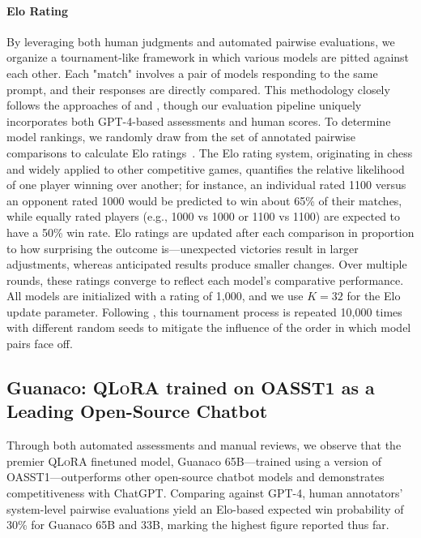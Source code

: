 \paragraph{Elo Rating} By leveraging both human judgments and automated pairwise evaluations, we organize a tournament-like framework in which various models are pitted against each other. Each "match" involves a pair of models responding to the same prompt, and their responses are directly compared. This methodology closely follows the approaches of \citet{bai2022training} and \citet{vicuna2023}, though our evaluation pipeline uniquely incorporates both GPT-4-based assessments and human scores. To determine model rankings, we randomly draw from the set of annotated pairwise comparisons to calculate Elo ratings~\citep{elo1967proposed,elo1978rating}. The Elo rating system, originating in chess and widely applied to other competitive games, quantifies the relative likelihood of one player winning over another; for instance, an individual rated 1100 versus an opponent rated 1000 would be predicted to win about 65\% of their matches, while equally rated players (e.g., 1000 vs 1000 or 1100 vs 1100) are expected to have a 50\% win rate. Elo ratings are updated after each comparison in proportion to how surprising the outcome is—unexpected victories result in larger adjustments, whereas anticipated results produce smaller changes. Over multiple rounds, these ratings converge to reflect each model's comparative performance. All models are initialized with a rating of 1,000, and we use $K=32$ for the Elo update parameter. Following \citet{vicuna2023}, this tournament process is repeated 10,000 times with different random seeds to mitigate the influence of the order in which model pairs face off.

\subsection{\textbf{Guanaco}: \textsc{QLoRA} trained on OASST1 as a Leading Open-Source Chatbot}

Through both automated assessments and manual reviews, we observe that the premier \textsc{QLoRA} finetuned model, {Guanaco} 65B—trained using a version of OASST1—outperforms other open-source chatbot models and demonstrates competitiveness with ChatGPT. Comparing against GPT-4, human annotators’ system-level pairwise evaluations yield an Elo-based expected win probability of 30\% for {Guanaco} 65B and 33B, marking the highest figure reported thus far.

